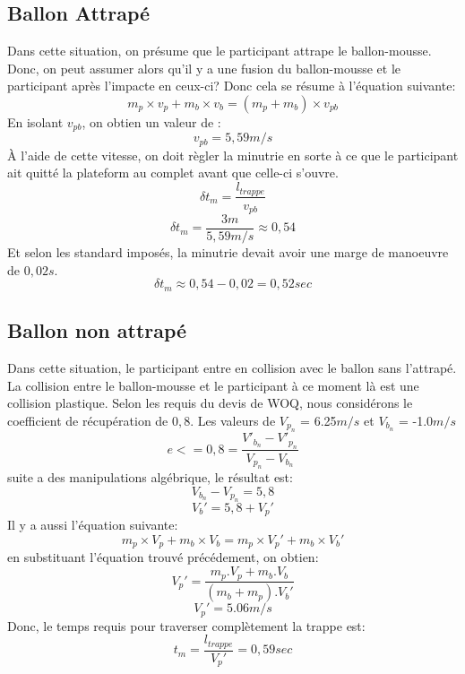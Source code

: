 \documentclass[12pt]{article}
\begin{document}
\subsection{Ballon Attrapé}
Dans cette situation, on présume que le participant attrape le ballon-mousse. Donc, on peut assumer alors qu'il y a une fusion du ballon-mousse et le participant après l'impacte en ceux-ci? Donc cela se résume à l'équation suivante:
\begin{equation}
m_p\times v_p + m_b\times v_b = (m_p + m_b)\times v_{pb}
\end{equation}
En isolant $v_{pb}$, on obtien un valeur de :
\begin{equation}
v_{pb} = 5,59m/s
\end{equation}
À l'aide de cette vitesse, on doit règler la minutrie en sorte à ce que le participant ait quitté la plateform au complet avant que celle-ci s'ouvre.
\begin{equation}
\delta t_m = \frac{l_{trappe}}{v_{pb}}
\end{equation}
\begin{equation}
\delta t_m = \frac{3m}{5,59m/s} \approx{0,54}
\end{equation}
Et selon les standard imposés, la minutrie devait avoir une marge de manoeuvre de $0,02s$.
\begin{equation}
\delta t_m \approx{0,54 - 0,02} = 0,52sec
\end{equation}
\subsection{Ballon non attrapé}
Dans cette situation, le participant entre en collision avec le ballon sans l'attrapé. La collision entre le ballon-mousse et le participant à ce moment là est une collision plastique. Selon les requis du devis de WOQ, nous considérons le coefficient de récupération de $0,8$. Les valeurs de $V_{p_n}$ = 6.25$m/s$ et $V_{b_n}$ = -1.0$m/s$
\begin{equation}
e <= 0,8 = \frac{V'_{b_n} - V'_{p_n}}{V_{p_n} - V_{b_n}}
\end{equation}
suite a des manipulations algébrique, le résultat est:
\begin{equation}
{V_{b_n} - V_{p_n}} = 5,8
\end{equation}
\begin{equation}
V_b' = 5,8 + V_p'
\end{equation}
Il y a aussi l'équation suivante:
\begin{equation}
m_p\times V_p + m_b\times V_b = m_p\times V_p' + m_b\times V_b'
\end{equation}
\noindent
en substituant l'équation trouvé précédement, on obtien:
\begin{equation}
V_p' = \frac{m_p.V_p + m_b.V_b}{(m_b + m_p).V_b'}
\end{equation}
\begin{equation}
V_p' = 5.06m/s
\end{equation}
Donc, le temps requis pour traverser complètement la trappe est:
\begin{equation}
t_m = \frac{l_{trappe}}{V_p'} = 0,59 sec
\end{equation}
\end{document}
